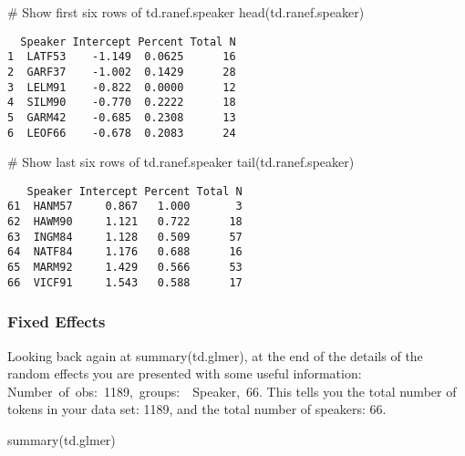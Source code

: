 \documentclass[
  10pt,
  letterpaper]{article}
\newenvironment{Shaded}{\begin{snugshade}}{\end{snugshade}}
\newcommand{\CommentTok}[1]{\textcolor[rgb]{0.37,0.37,0.37}{#1}}
\newcommand{\FunctionTok}[1]{\textcolor[rgb]{0.28,0.35,0.67}{#1}}
\newcommand{\NormalTok}[1]{\textcolor[rgb]{0.00,0.23,0.31}{#1}}
\renewcommand\texttt[1]{{\ttfamily\color{BrickRed}#1}}
\begin{document}
\begin{Shaded}
\begin{Highlighting}[]
\CommentTok{\# Show first six rows of td.ranef.speaker}
\FunctionTok{head}\NormalTok{(td.ranef.speaker)}
\end{Highlighting}
\end{Shaded}

\begin{verbatim}
  Speaker Intercept Percent Total N
1  LATF53    -1.149  0.0625      16
2  GARF37    -1.002  0.1429      28
3  LELM91    -0.822  0.0000      12
4  SILM90    -0.770  0.2222      18
5  GARM42    -0.685  0.2308      13
6  LEOF66    -0.678  0.2083      24
\end{verbatim}

\begin{Shaded}
\begin{Highlighting}[]
\CommentTok{\# Show last six rows of td.ranef.speaker}
\FunctionTok{tail}\NormalTok{(td.ranef.speaker)}
\end{Highlighting}
\end{Shaded}

\begin{verbatim}
   Speaker Intercept Percent Total N
61  HANM57     0.867   1.000       3
62  HAWM90     1.121   0.722      18
63  INGM84     1.128   0.509      57
64  NATF84     1.176   0.688      16
65  MARM92     1.429   0.566      53
66  VICF91     1.543   0.588      17
\end{verbatim}

\hypertarget{fixed-effects}{%
\subsubsection{Fixed Effects}\label{fixed-effects}}

Looking back again at \texttt{summary(td.glmer)}, at the end of the
details of the random effects you are presented with some useful
information: \texttt{Number\ of\ obs:\ 1189,\ groups:\ \ Speaker,\ 66}.
This tells you the total number of tokens in your data set:
\texttt{1189}, and the total number of speakers: \texttt{66}.

\begin{Shaded}
\begin{Highlighting}[]
\FunctionTok{summary}\NormalTok{(td.glmer)}
\end{Highlighting}
\end{Shaded}
\end{document}
